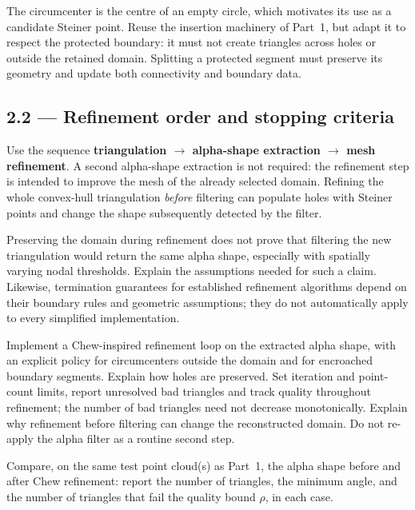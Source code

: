 \documentclass[11pt,a4paper]{article}
\begin{document}
The circumcenter is the centre of an empty circle, which motivates its use
as a candidate Steiner point. Reuse the insertion machinery of Part~1, but
adapt it to respect the protected boundary: it must not create triangles
across holes or outside the retained domain. Splitting a protected segment
must preserve its geometry and update both connectivity and boundary data.

\subsection*{2.2 --- Refinement order and stopping criteria}

Use the sequence \textbf{triangulation $\to$ alpha-shape extraction $\to$
mesh refinement}. A second alpha-shape extraction is not required: the
refinement step is intended to improve the mesh of the already selected
domain. Refining the whole convex-hull triangulation \emph{before}
filtering can populate holes with Steiner points and change the shape
subsequently detected by the filter.

\begin{note}
Preserving the domain during refinement does not prove that filtering the
new triangulation would return the same alpha shape, especially with
spatially varying nodal thresholds. Explain the assumptions needed for
such a claim. Likewise, termination guarantees for established refinement
algorithms depend on their boundary rules and geometric assumptions;
they do not automatically apply to every simplified implementation.
\end{note}

\begin{task}\label{tsk:chew}
Implement a Chew-inspired refinement loop on the extracted alpha shape,
with an explicit policy for circumcenters outside the domain and for
encroached boundary segments. Explain how holes are preserved. Set iteration
and point-count limits, report unresolved bad triangles and track quality
throughout refinement; the number of bad triangles need not decrease
monotonically. Explain why refinement before filtering can change the
reconstructed domain. Do not re-apply the alpha filter as a routine second
step.
\end{task}

\begin{task}
Compare, on the same test point cloud(s) as Part~1, the alpha shape before
and after Chew refinement: report the number of triangles, the minimum
angle, and the number of triangles that fail the quality bound $\rho$, in
each case.
\end{task}
\end{document}
